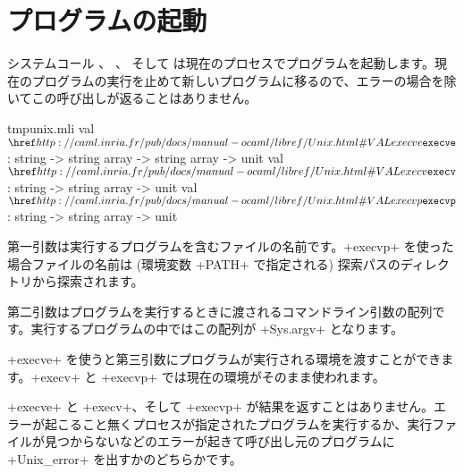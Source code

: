 \medskip

\section{プログラムの起動}

システムコール 、 、 そして  は現在のプロセスでプログラムを起動します。現在のプログラムの実行を止めて新しいプログラムに移るので、エラーの場合を除いてこの呼び出しが返ることはありません。
%
\begin{listingcodefile}{tmpunix.mli}
val $\libvalue{Unix}{execve}$ : string -> string array -> string array -> unit
val $\libvalue{Unix}{execv}$  : string -> string array -> unit
val $\libvalue{Unix}{execvp}$ : string -> string array -> unit
\end{listingcodefile}
%
第一引数は実行するプログラムを含むファイルの名前です。\ml+execvp+ を使った場合ファイルの名前は (環境変数 \ml+PATH+ で指定される) 探索パスのディレクトリから探索されます。

第二引数はプログラムを実行するときに渡されるコマンドライン引数の配列です。実行するプログラムの中ではこの配列が \ml+Sys.argv+ となります。

\ml+execve+ を使うと第三引数にプログラムが実行される環境を渡すことができます。\ml+execv+ と \ml+execvp+ では現在の環境がそのまま使われます。

\ml+execve+ と \ml+execv+、そして \ml+execvp+ が結果を返すことはありません。エラーが起こること無くプロセスが指定されたプログラムを実行するか、実行ファイルが見つからないなどのエラーが起きて呼び出し元のプログラムに \ml+Unix_error+ を出すかのどちらかです。

